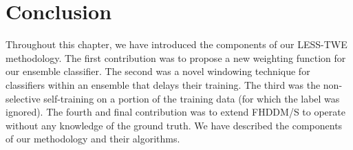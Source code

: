 
\section{Conclusion}
Throughout this chapter, we have introduced the components of our LESS-TWE methodology. The first contribution was to propose a new weighting function for our ensemble classifier. The second was a novel windowing technique for classifiers within an ensemble that delays their training. The third was the non-selective self-training on a portion of the training data (for which the label was ignored). The fourth and final contribution was to extend FHDDM/S to operate without any knowledge of the ground truth. We have described the components of our methodology and their algorithms.